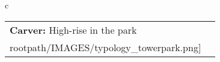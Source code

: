 \begin{table}[H]
        \begin{tabular}{c}
        \begin{tabular}{m{1.5in} m{2in}}
\textbf{Carver:} {High-rise in the park} & \texttt{[image: \\rootpath/IMAGES/typology\_towerpark.png]}
\end{tabular}\end{tabular}
        \end{table}